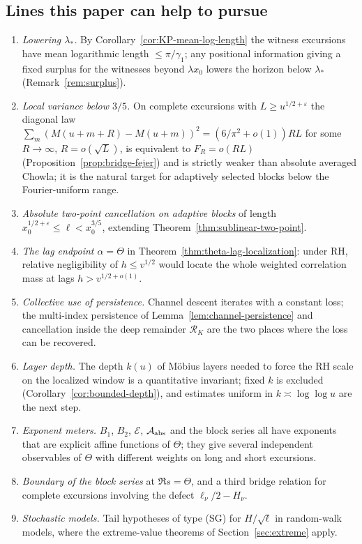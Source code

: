 \documentclass[11pt]{amsart}
\numberwithin{equation}{section}
\theoremstyle{plain}
\theoremstyle{definition}
\theoremstyle{remark}
\newcommand{\eps}{\varepsilon}
\newcommand{\En}{\mathcal{E}}
\begin{document}
\subsection*{Lines this paper can help to pursue}
\begin{enumerate}[label=\textup{(\arabic*)}]
\item \emph{Lowering $\lambda_*$.} By Corollary~\ref{cor:KP-mean-log-length}
the witness excursions have mean logarithmic length $\le\pi/\gamma_1$; any
positional information giving a fixed surplus for the witnesses beyond
$\lambda x_0$ lowers the horizon below $\lambda_*$
(Remark~\ref{rem:surplus}).
\item \emph{Local variance below $3/5$.} On complete excursions with
$L\ge u^{1/2+\eps}$ the diagonal law
$\sum_m(M(u+m+R)-M(u+m))^2=(6/\pi^2+o(1))RL$ for some $R\to\infty$,
$R=o(\sqrt L)$, is equivalent to $F_R=o(RL)$
(Proposition~\ref{prop:bridge-fejer}) and is strictly weaker than absolute
averaged Chowla; it is the natural target for adaptively selected blocks
below the Fourier-uniform range.
\item \emph{Absolute two-point cancellation on adaptive blocks} of length
$x_0^{1/2+\eps}\le\ell<x_0^{3/5}$, extending
Theorem~\ref{thm:sublinear-two-point}.
\item \emph{The lag endpoint $\alpha=\Theta$} in
Theorem~\ref{thm:theta-lag-localization}: under RH, relative negligibility
of $h\le v^{1/2}$ would locate the whole weighted correlation mass at lags
$h>v^{1/2+o(1)}$.
\item \emph{Collective use of persistence.} Channel descent iterates with a
constant loss; the multi-index persistence of
Lemma~\ref{lem:channel-persistence} and cancellation inside the deep
remainder $\mathcal R_K$ are the two places where the loss can be recovered.
\item \emph{Layer depth.} The depth $k(u)$ of Möbius layers needed to force
the RH scale on the localized window is a quantitative invariant; fixed $k$
is excluded (Corollary~\ref{cor:bounded-depth}), and estimates uniform in
$k\asymp\log\log u$ are the next step.
\item \emph{Exponent meters.} $B_1$, $B_2$, $\En$, $\mathcal A_{\rm abs}$
and the block series all have exponents that are explicit affine functions
of $\Theta$; they give several independent observables of $\Theta$ with
different weights on long and short excursions.
\item \emph{Boundary of the block series} at $\Re s=\Theta$, and a third
bridge relation for complete excursions involving the defect
$\ell_\nu/2-H_\nu$.
\item \emph{Stochastic models.} Tail hypotheses of type (SG) for
$H/\sqrt\ell$ in random-walk models, where the extreme-value theorems of
Section~\ref{sec:extreme} apply.
\end{enumerate}
\end{document}
